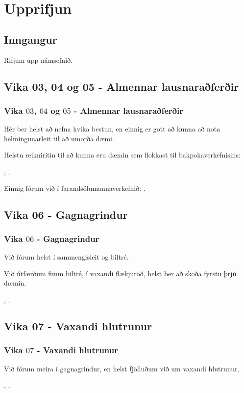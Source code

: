 \section{Upprifjun}
\subsection{Inngangur}
{
    {
        \item<1-> Rifjum upp námsefnið.
    }
}

\subsection{Vika 03, 04 og 05 - Almennar lausnaraðferðir}
{
    \frametitle{Vika $03$, $04$ og $05$ - Almennar lausnaraðferðir}
    {
        \item<1-> Hér ber helst að nefna kvika bestun, en einnig er gott að kunna að nota helmingunarleit til að umorða dæmi.
        \item<2-> Helstu reikniritin til að kunna eru dæmin sem flokkast til bakpokaverkefnisins:
        {
            \item<3-> , , 
            \item<4-> 
            \item<5-> 
        }
        \item<6-> Einnig fórum við í farandsölumannaverkefnið: .
    }
}

\subsection{Vika 06 - Gagnagrindur}
{
    \frametitle{Vika $06$ - Gagnagrindur}
    {
        \item<1-> Við fórum helst í sammengisleit og biltré.
        \item<2-> Við útfærðum fimm biltré, í vaxandi flækjuröð, helst ber að skoða fyrstu þrjú dæmin.
        {
            \item<3-> , , 
            \item<4-> 
        }
    }
}

\subsection{Vika 07 - Vaxandi hlutrunur}
{
    \frametitle{Vika $07$ - Vaxandi hlutrunur}
    {
        \item<1-> Við fórum meira í gagnagrindur, en helst fjölluðum við um vaxandi hlutrunur.
        {
            \item<2-> , , 
        }
    }
}

